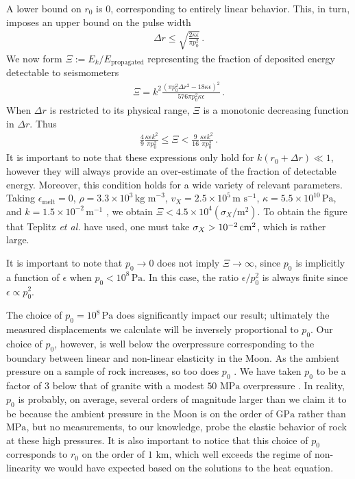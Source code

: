 \documentclass[prd,reprint,10pt]{revtex4-1}
\newcommand*\te[1]{\text{#1}}
\newcommand*\p[1]{\left(#1\right)}
\newcommand*\f[2]{\frac{#1}{#2}}
\begin{document}
A lower bound on $r_0$ is 0, corresponding to entirely linear behavior. This, in turn, imposes an upper bound on the pulse width
\begin{align}
\Delta r\leq\sqrt{\f{2\kappa \epsilon}{\pi p_0^2}}\,.
\end{align}
We now form $\Xi:=E_k/E_\te{propagated}$ representing the fraction of deposited energy detectable to seismometers
\begin{align}
\Xi = k^2\f{\p{\pi p_0^2\Delta r^2-18\kappa \epsilon}^2}{576 \pi p_0^2 \kappa \epsilon}\,.
\end{align}
When $\Delta r$ is restricted to its physical range, $\Xi$ is a monotonic decreasing function in $\Delta r$. Thus
\begin{align}
\f{4}{9}\f{\kappa\epsilon k^2}{\pi  p_0^2} \leq \Xi <\f{9}{16}\f{\kappa\epsilon k^2}{\pi  p_0^2}\,.
\end{align}
It is important to note that these expressions only hold for $k(r_0+\Delta r)\ll 1$, however they will always provide an over-estimate of the fraction of detectable energy. Moreover, this condition holds for a wide variety of relevant parameters. Taking $\epsilon_\te{melt} = 0$, $\rho = 3.3\times 10^3\,\te{kg m}^{-3}$, $v_X = 2.5\times 10^5\,\te{m s}^{-1}$, $\kappa = 5.5\times 10^{10}\,\te{Pa}$, and $k = 1.5\times 10^{-2}\,\te{m}^{-1}$ \cite{garcia2011very}, we obtain $\Xi<4.5\times 10^4 (\sigma_X/\te{m}^2)$. To obtain the figure that Teplitz \textit{et al.} have used, one must take $\sigma_X >10^{-2}\te{\,cm}^2$, which is rather large.

It is important to note that $p_0\to 0$ does not imply $\Xi\to\infty$, since $p_0$ is implicitly a function of $\epsilon$ when $p_0<10^8\,\te{Pa}$. In this case, the ratio $\epsilon/p_0^2$ is always finite since $\epsilon\propto p_0^2$.

The choice of $p_0 = 10^8\,\te{Pa}$ does significantly impact our result; ultimately the measured displacements we calculate will be inversely proportional to $p_0$. Our choice of $p_0$, however, is well below the overpressure corresponding to the boundary between linear and non-linear elasticity in the Moon. As the ambient pressure on a sample of rock increases, so too does $p_0$ \cite{mair2002influence}\cite{shimada1993lithosphere}\cite{ord1991deformation}. We have taken $p_0$ to be a factor of $3$ below that of granite with a modest $50\te{ MPa}$ overpressure \cite{lockner200232}. In reality, $p_0$ is probably, on average, several orders of magnitude larger than we claim it to be because the ambient pressure in the Moon is on the order of $\te{GPa}$ rather than $\te{MPa}$, but no measurements, to our knowledge, probe the elastic behavior of rock at these high pressures. It is also important to notice that this choice of $p_0$ corresponds to $r_0$ on the order of $1\te{ km}$, which well exceeds the regime of non-linearity we would have expected based on the solutions to the heat equation. 
\end{document}
